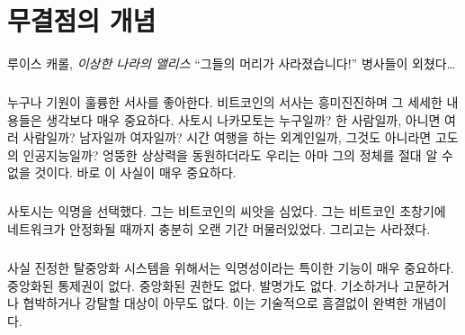 \chapter{무결점의 개념}
\label{les:5}

\begin{chapquote}{루이스 캐롤, \textit{이상한 나라의 앨리스}}
	\enquote{그들의 머리가 사라졌습니다!} 병사들이 외쳤다\ldots
\end{chapquote}

\paragraph{}
누구나 기원이 훌륭한 서사를 좋아한다. 
비트코인의 서사는 흥미진진하며 그 세세한 내용들은 생각보다 매우 중요하다. 
사토시 나카모토는 누구일까? 한 사람일까, 아니면 여러 사람일까? 남자일까 여자일까? 시간 여행을 하는 외계인일까, 그것도 아니라면 고도의 인공지능일까? 
엉뚱한 상상력을 동원하더라도 우리는 아마 그의 정체를 절대 알 수 없을 것이다.
바로 이 사실이 매우 중요하다.

\paragraph{}
사토시는 익명을 선택했다. 그는 비트코인의 씨앗을 심었다. 
그는 비트코인 초창기에 네트워크가 안정화될 때까지 충분히 오랜 기간 머물러있었다. 
그리고는 사라졌다.

\paragraph{}
사실 진정한 탈중앙화 시스템을 위해서는 익명성이라는 특이한 기능이 매우 중요하다.
중앙화된 통제권이 없다. 중앙화된 권한도 없다. 발명가도 없다.
기소하거나 고문하거나 협박하거나 강탈할 대상이 아무도 없다. 
이는 기술적으로 흠결없이 완벽한 개념이다.

